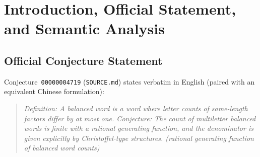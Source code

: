 \documentclass[11pt,a4paper]{article}
\theoremstyle{definition}
\newcommand{\Q}{\mathbb{Q}}
\begin{document}
\begin{abstract}
\begin{enumerate}
  \item \textbf{Christoffel-denominator clause:} Because no nonzero polynomial denominator $Q \in \Q[x]$ exists at all, the conjecture fails uniformly for any Christoffel-type denominator predicate.
\end{enumerate}
All core disproof theorems and positive non-vacuity witnesses are formalized from scratch in Core Lean~4.19.0 with zero external dependencies and zero \texttt{sorry}s, accompanied by an independent Python~3.12 verification suite.
\end{abstract}

\section{Introduction, Official Statement, and Semantic Analysis}

\subsection{Official Conjecture Statement}
Conjecture~\texttt{00000004719} (\texttt{SOURCE.md}) states verbatim in English (paired with an equivalent Chinese formulation):
\begin{quote}
\emph{Definition: A balanced word is a word where letter counts of same-length factors differ by at most one. Conjecture: The count of multiletter balanced words is finite with a rational generating function, and the denominator is given explicitly by Christoffel-type structures. (rational generating function of balanced word counts)}
\end{quote}
\end{document}
